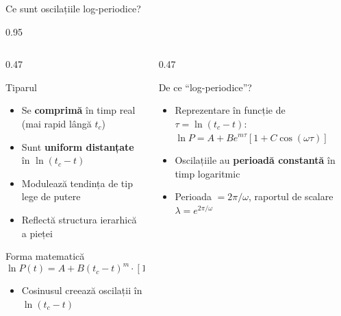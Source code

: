 \documentclass[9pt, aspectratio=169, t]{beamer}
\begin{document}
\begin{frame}{Ce sunt oscilațiile log-periodice?}
    \begin{cminipage}{0.95\textwidth}
    {\footnotesize
    \begin{columns}[T]
        \begin{column}{0.47\textwidth}
            \begin{block}{Tiparul}
                \begin{itemize}\setlength{\itemsep}{0pt}
                    \item Se \textbf{comprimă} în timp real (mai rapid lângă $t_c$)
                    \item Sunt \textbf{uniform distanțate} în $\ln(t_c - t)$
                    \item Modulează tendința de tip lege de putere
                    \item Reflectă structura ierarhică a pieței
                \end{itemize}
            \end{block}

            \begin{exampleblock}{Forma matematică}
                $$\ln P(t) = A + B(t_c-t)^m \cdot [1 + C\cos(\omega\ln(t_c-t))]$$
                \begin{itemize}\setlength{\itemsep}{0pt}
                    \item Cosinusul creează oscilații în $\ln(t_c - t)$
                \end{itemize}
            \end{exampleblock}
        \end{column}
        \begin{column}{0.47\textwidth}
            \begin{alertblock}{De ce ``log-periodice''?}
                \begin{itemize}\setlength{\itemsep}{0pt}
                    \item Reprezentare în funcție de $\tau = \ln(t_c - t)$: $\ln P = A + Be^{m\tau}[1 + C\cos(\omega\tau)]$
                    \item Oscilațiile au \textbf{perioadă constantă} în timp logaritmic
                    \item Perioada $= 2\pi/\omega$, raportul de scalare $\lambda = e^{2\pi/\omega}$
                \end{itemize}
            \end{alertblock}


\end{column}
\end{columns}}
\end{cminipage}
\end{frame}
\end{document}
